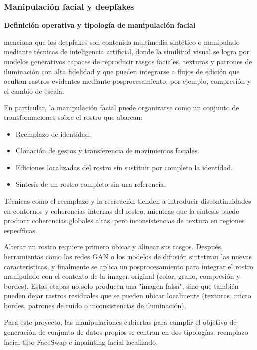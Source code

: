 \subsubsection{Manipulación facial y deepfakes}

\medskip\textbf{Definición operativa y tipología de manipulación facial}

\textcite{Mirsky2021} menciona que los deepfakes son contenido multimedia sintético o manipulado mediante técnicas de inteligencia artificial, donde la similitud visual se logra por modelos generativos capaces de reproducir rasgos faciales, texturas y patrones de iluminación con alta fidelidad y que pueden integrarse a flujos de edición que ocultan rastros evidentes mediante posprocesamiento, por ejemplo, compresión y el cambio de escala.

En particular, la manipulación facial puede organizarse como un conjunto de transformaciones sobre el rostro que abarcan:
\begin{itemize}
    \item Reemplazo de identidad.
    \item Clonación de gestos y transferencia de movimientos faciales.
    \item Ediciones localizadas del rostro sin sustituir por completo la identidad.
    \item Síntesis de un rostro completo sin una referencia. 
\end{itemize}

Técnicas como el reemplazo y la recreación tienden a introducir discontinuidades en contornos y coherencias internas del rostro, mientras que la síntesis puede producir coherencias globales altas, pero inconsistencias de textura en regiones específicas. \parencite{MurguiaSerrano2025}


Alterar un rostro requiere primero ubicar y alinear sus rasgos. Después, herramientas como las redes GAN o los modelos de difusión sintetizan las nuevas características, y finalmente se aplica un posprocesamiento para integrar el rostro manipulado con el contexto de la imagen original (color, grano, compresión y bordes). Estas etapas no solo producen una "imagen falsa", sino que también pueden dejar rastros residuales que se pueden ubicar localmente (texturas, micro bordes, patrones de ruido o inconsistencias de iluminación).

Para este proyecto, las manipulaciones cubiertas para cumplir el objetivo de generación de conjunto de datos propios se centran en dos tipologías: reemplazo facial tipo FaceSwap e inpainting facial localizado\parencite{Rossler_2019_ICCV, Rombach2022}.

